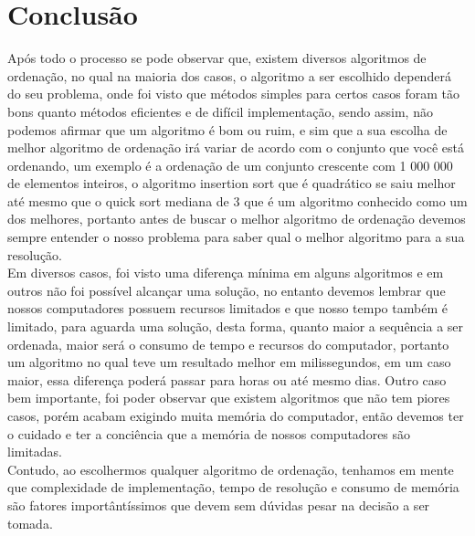 \documentclass[
	12pt,				%
	oneside,			%
	a4paper,			%
	english,			%
	brazil,				%
	]{article}
\begin{document}
\section{Conclusão}
Após todo o processo se pode observar que, existem diversos algoritmos de ordenação, no qual na maioria dos casos, o algoritmo a ser escolhido dependerá do seu 
problema, onde foi visto que métodos simples para certos casos foram tão bons quanto métodos eficientes e de difícil implementação, sendo assim, não podemos afirmar 
que um algoritmo é bom ou ruim, e sim que a sua escolha de melhor algoritmo de ordenação irá variar de acordo com o conjunto que você está ordenando, um exemplo é a
ordenação de um conjunto crescente com 1 000 000 de elementos inteiros, o algoritmo insertion sort que é quadrático se saiu melhor até mesmo que o quick sort mediana de 3 que 
é um algoritmo conhecido como um dos melhores, portanto antes de buscar o melhor algoritmo de ordenação devemos sempre entender o nosso problema para saber qual o melhor
algoritmo para a sua resolução.\\
\indent Em diversos casos, foi visto uma diferença mínima em alguns algoritmos e em outros não foi possível alcançar uma solução, no entanto devemos lembrar que nossos computadores possuem recursos limitados e que nosso 
tempo também é limitado, para aguarda uma solução, desta forma, quanto maior a sequência a ser ordenada, maior será o consumo de tempo e recursos do computador, portanto 
um algoritmo no qual teve um resultado melhor em milissegundos, em um caso maior, essa diferença poderá passar para horas ou até mesmo dias. Outro caso bem importante, foi
poder observar que existem algoritmos que não tem piores casos, porém acabam exigindo muita memória do computador, então devemos ter o cuidado e ter a conciência que a memória
de nossos computadores são limitadas.\\
\indent Contudo, ao escolhermos qualquer algoritmo de ordenação, tenhamos em mente que complexidade de implementação, tempo de resolução e consumo de memória são fatores 
importântíssimos que devem sem dúvidas pesar na decisão a ser tomada.\\
\newpage


{}


%
%
\end{document}
